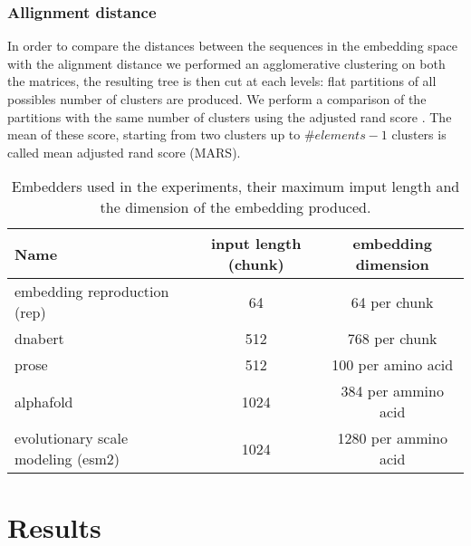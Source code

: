 \documentclass[12pt, letterpaper, twocolumn]{article}
\begin{document}
\subsubsection{Allignment distance}
In order to compare the distances between the sequences in the embedding space with the alignment distance we performed an agglomerative clustering on both the matrices, the resulting tree is then cut at each levels: flat partitions of all possibles number of clusters are produced. We perform a comparison of the partitions with the same number of clusters using the adjusted rand score \cite{hubert1985comparing}. The mean of these score, starting from two clusters up to $ \#elements - 1 $ clusters is called mean adjusted rand score (MARS). 







\onecolumn
\begin{table}[h]
\centering
\begin{tabular}{|l c c|} 
    \hline
    Name & input length (chunk) & embedding dimension  \\ 
    \hline
    embedding reproduction (rep)\cite{yang2018learned}       & 64    & 64 per chunk   \\
    dnabert \cite{ji2021dnabert}                     & 512     & 768 per chunk \\
    prose   \cite{bepler2021learning}                   & 512   & 100 per amino acid   \\
    alphafold  \cite{jumper2021highly}                 & 1024   & 384 per ammino acid\\
    evolutionary scale modeling (esm2) \cite{lin2022language}   & 1024    & 1280 per ammino acid \\  
    \hline
\end{tabular}
\caption{Embedders used in the experiments, their maximum imput length and the dimension of the embedding produced.}
\label{table:data}
\end{table}
\twocolumn

\section{Results}

\onecolumn
\newpage
\FloatBarrier


\end{document}
